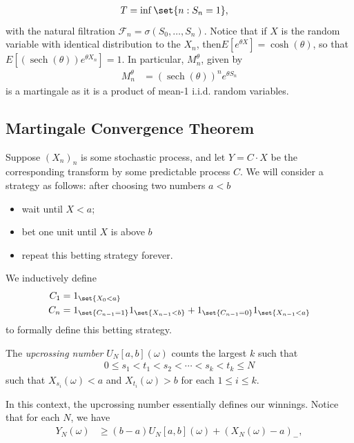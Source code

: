 \documentclass[10pt]{mypackage}
\begin{document}
\begin{align*}
  T &= \inf\set{n : S_n = 1},
\end{align*}
with the natural filtration $\mathcal{F}_n = \sigma\left( S_0,\dots,S_n \right)$. Notice that if $X$ is the random variable with identical distribution to the  $X_n$, then$E\left[ e^{\theta X} \right] = \cosh\left( \theta \right)$, so that $E\left[ \left( \operatorname{sech}\left( \theta \right) \right)e^{\theta X_n} \right] = 1$. In particular, $M_{n}^{\theta}$, given by
\begin{align*}
  M_n^{\theta} &= \left( \operatorname{sech}\left( \theta \right) \right)^{n} e^{\theta S_n}
\end{align*}
is a martingale as it is a product of mean-1 i.i.d. random variables.
\subsection{Martingale Convergence Theorem}%
Suppose $\left( X_n \right)_n$ is some stochastic process, and let $Y = C\cdot X$ be the corresponding transform by some predictable process $C$. We will consider a strategy as follows: after choosing two numbers $a < b$
\begin{itemize}
  \item wait until $X < a$;
  \item bet one unit until $X$ is above $b$
  \item repeat this betting strategy forever.
\end{itemize}
We inductively define
\begin{align*}
  C_1 &= 1_{\set{X_0 < a}}\\
  C_n &= 1_{\set{C_{n-1} = 1}}1_{\set{X_{n-1} < b}} + 1_{\set{C_{n-1} = 0}}1_{\set{X_{n-1} < a}}
\end{align*}
to formally define this betting strategy.
\begin{definition}
  The \textit{upcrossing number} $U_N[a,b](\omega)$ counts the largest $k$ such that
  \begin{align*}
    0\leq s_1 < t_1 < s_2 < \cdots < s_k < t_k\leq N
  \end{align*}
  such that $X_{s_i}(\omega) < a$ and $X_{t_i}(\omega) > b$ for each $1\leq i \leq k$.
\end{definition}
In this context, the upcrossing number essentially defines our winnings. Notice that for each $N$, we have
\begin{align*}
  Y_N(\omega) &\geq \left( b-a \right)U_N[a,b](\omega) + \left( X_N(\omega)-a \right)_{-},
\end{align*}
\end{document}
